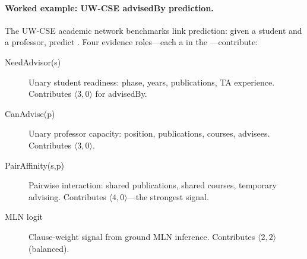 \documentclass[11pt,openany]{report}
\begin{document}
\paragraph{Worked example: UW-CSE advisedBy prediction.}
The UW-CSE academic network benchmarks link prediction:
given a student and a professor, predict
.  Four evidence roles---each
a  in the ---contribute:

\begin{description}
\item[NeedAdvisor(s)] Unary student readiness: phase, years,
  publications, TA experience.  Contributes $\langle 3, 0 \rangle$
  for advisedBy.
\item[CanAdvise(p)] Unary professor capacity: position,
  publications, courses, advisees.  Contributes
  $\langle 3, 0 \rangle$.
\item[PairAffinity(s,p)] Pairwise interaction: shared
  publications, shared courses, temporary advising.  Contributes
  $\langle 4, 0 \rangle$---the strongest signal.
\item[MLN logit] Clause-weight signal from ground MLN inference.
  Contributes $\langle 2, 2 \rangle$ (balanced).
\end{description}
\end{document}
